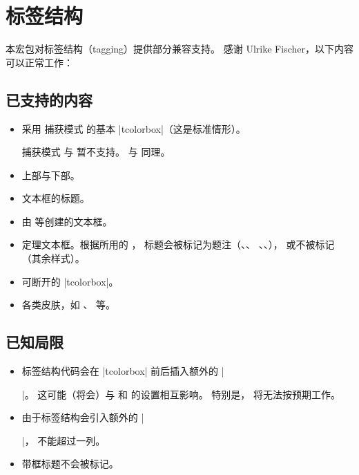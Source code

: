 \clearpage
\section{标签结构}\label{sec:tagging}%
%

本宏包对标签结构（tagging）提供部分兼容支持。
感谢 Ulrike Fischer，以下内容可以正常工作：

\subsection{已支持的内容}

\begin{itemize}
\item 采用  捕获模式  的基本
  |tcolorbox|（这是标准情形）。\par
  捕获模式  与  暂不支持。
   与  同理。
\item 上部与下部。
\item 文本框的标题。
\item 由  等创建的文本框。
\item 定理文本框。根据所用的 ，
  标题会被标记为题注（、、
  、、），
  或不被标记（其余样式）。
\item 可断开的 |tcolorbox|。
\item 各类皮肤，如 、 等。
\end{itemize}

\subsection{已知局限}
\begin{itemize}
\item 标签结构代码会在 |tcolorbox| 前后插入额外的 |\par|。
  这可能（将会）与  和  的设置相互影响。
  特别是， 将无法按预期工作。
\item 由于标签结构会引入额外的 |\par|， 不能超过一列。
\item 带框标题不会被标记。
\end{itemize}
